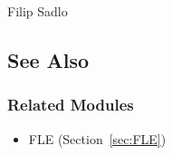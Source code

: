 Filip Sadlo


\subsection{See Also}


\subsubsection{Related Modules}

\begin{itemize}

\item
  FLE (Section~\ref{sec:FLE})
\end{itemize}

